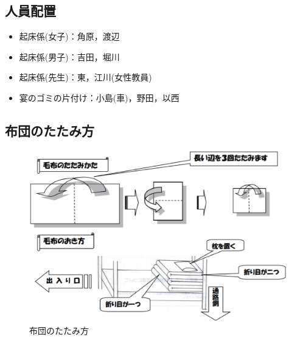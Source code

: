 \subsection{人員配置}
\begin{itemize}
\item 起床係(女子)：角原，渡辺
\item 起床係(男子)：吉田，堀川
\item 起床係(先生)：東，江川(女性教員)
\item 宴のゴミの片付け：小島(車)，野田，以西
\end{itemize}

\clearpage

\subsection{布団のたたみ方}
\begin{figure}[h]
\begin{center}
\includegraphics[scale=0.5]{./16/futon_katazuke.eps}
\caption{布団のたたみ方}
\label{fig:futon_katazuke}
\end{center}
\end{figure}


